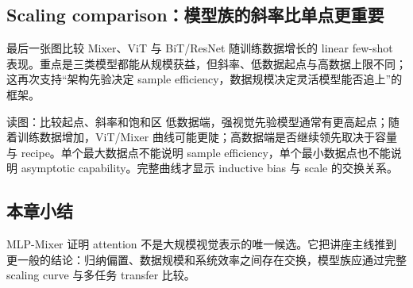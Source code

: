 \subsection{Scaling comparison：模型族的斜率比单点更重要}

最后一张图比较 Mixer、ViT 与 BiT/ResNet 随训练数据增长的 linear few-shot 表现。重点是三类模型都能从规模获益，但斜率、低数据起点与高数据上限不同；这再次支持“架构先验决定 sample efficiency，数据规模决定灵活模型能否追上”的框架。


\begin{knowledgebox}{读图：比较起点、斜率和饱和区}
低数据端，强视觉先验模型通常有更高起点；随着训练数据增加，ViT/Mixer 曲线可能更陡；高数据端是否继续领先取决于容量与 recipe。单个最大数据点不能说明 sample efficiency，单个最小数据点也不能说明 asymptotic capability。完整曲线才显示 inductive bias 与 scale 的交换关系。
\end{knowledgebox}


\subsection{本章小结}

MLP-Mixer 证明 attention 不是大规模视觉表示的唯一候选。它把讲座主线推到更一般的结论：归纳偏置、数据规模和系统效率之间存在交换，模型族应通过完整 scaling curve 与多任务 transfer 比较。

